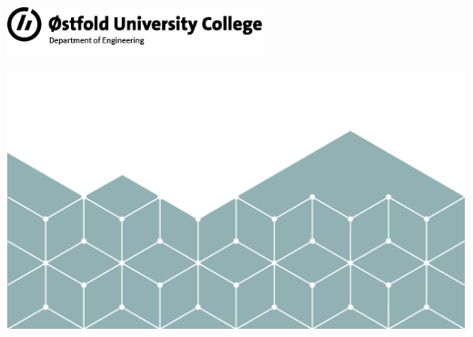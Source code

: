 
\begin{titlepage}

    \begin{flushright}
        \includegraphics*[width=74mm]{images/logo.png}
    \end{flushright}

    \vspace{2cm}



    \noindent{\LARGE\textbf{\thesisTitle}}

    \vspace{0.5cm}

    \noindent{\large {\thesisSubtitle}}

    \vspace{1cm}

    \noindent{\large \authorName}


    \noindent\vspace{1cm}

    \noindent{\large \ProgramName}

    \vspace{0.5cm}

    \noindent{\large \DepartmentName}

    \vspace{1cm}

    \noindent{\large \supervisorName}

    \vspace{2cm}

    \noindent{\large \today}

    \centering
    \vspace*{\fill}
    \includegraphics*[width=\textwidth]{images/cover.png}

    \thispagestyle{empty} %
\end{titlepage}
